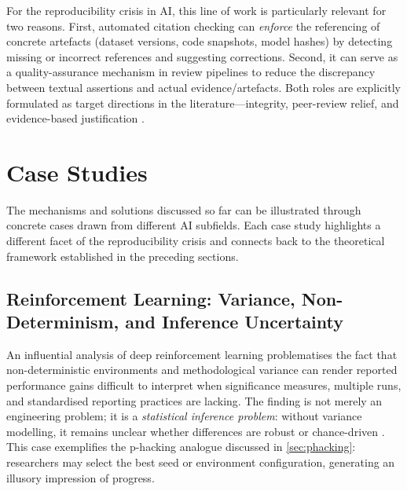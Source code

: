 \documentclass[12pt, a4paper]{article}
\begin{document}
For the reproducibility crisis in AI, this line of work is particularly
relevant for two reasons.  First, automated citation checking can
\emph{enforce} the referencing of concrete artefacts (dataset versions,
code snapshots, model hashes) by detecting missing or incorrect
references and suggesting corrections.  Second, it can serve as a
quality-assurance mechanism in review pipelines to reduce the
discrepancy between textual assertions and actual
evidence/artefacts.  Both roles are explicitly formulated as target
directions in the literature---integrity, peer-review relief, and
evidence-based justification \cite{SemanticCite2025}.

\section{Case Studies}
\label{sec:casestudies}

The mechanisms and solutions discussed so far can be illustrated through
concrete cases drawn from different AI subfields.  Each case study
highlights a different facet of the reproducibility crisis and connects
back to the theoretical framework established in the preceding sections.

\subsection{Reinforcement Learning: Variance, Non-Determinism, and
            Inference Uncertainty}
\label{sec:case_rl}

An influential analysis of deep reinforcement learning problematises the
fact that non-deterministic environments and methodological variance can
render reported performance gains difficult to interpret when
significance measures, multiple runs, and standardised reporting
practices are lacking.  The finding is not merely an engineering
problem; it is a \emph{statistical inference problem}: without variance
modelling, it remains unclear whether differences are robust or
chance-driven \cite{Henderson2018}.  This case exemplifies the
p-hacking analogue discussed in \cref{sec:phacking}: researchers may
select the best seed or environment configuration, generating an
illusory impression of progress.
\end{document}
